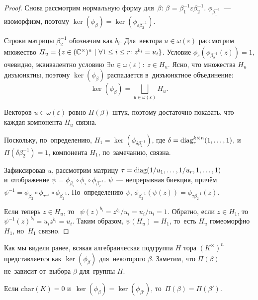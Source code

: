 \documentclass[a4paper,oneside]{article}
\begin{document}
\begin{proof}
    Снова рассмотрим нормальную форму для~$\beta$: $\beta$ = $\beta_1^{-1} \varepsilon \beta_2^{-1}$.
    $\phi_{\beta_1^{-1}}$~— изоморфизм, поэтому $\ker(\phi_{\beta}) = \ker(\phi_{\varepsilon \beta_2^{-1}})$.

    Строки матрицы $\beta_2^{-1}$ обозначим как $b_i$.
    Для~вектора $u \in \omega(\varepsilon)$ рассмотрим множество $H_u = \{z \in (\mathbb{C}^\times)^n \ | \ \forall 1 \leq i \leq r{:}\ z^{b_i} = u_i\}$.
    Условие $\phi_\varepsilon(\phi_{\beta_2^{-1}}(z)) = 1$, очевидно, эквивалентно условию $\exists u \in \omega(\varepsilon){:}\ z \in H_u$.
    Ясно, что множества $H_u$ дизъюнктны, поэтому $\ker(\phi_{\beta})$ распадается в~дизъюнктное объединение:
    $$
        \ker(\phi_{\beta}) = \bigsqcup_{u \in \omega(\varepsilon)} H_u.
    $$

    Векторов $u \in \omega(\varepsilon)$ ровно $\Pi(\beta)$ штук, поэтому достаточно показать, что каждая компонента $H_u$ связна.

    Поскольку, по~определению, $H_1 = \ker(\phi_{\delta \beta_2^{-1}})$, где $\delta = \mathrm{diag}^{k \times n}_r(1, \ldots, 1)$,
    и~$\Pi(\delta \beta_2^{-1}) = 1$, компонента $H_1$, по~замечанию, связна.

    Зафиксировав $u$, рассмотрим матрицу $\tau = \mathrm{diag}(1 / u_1, \ldots, 1 / u_r, 1, \ldots, 1)$ и~отображение $\psi = \phi_{\beta_2} \circ \phi_\tau \circ \phi_{\beta_2^{-1}}$.
    $\psi$~— непрерывная биекция, причём $\psi^{-1} = \phi_{\beta_2} \circ \phi_{\tau^{-1}} \circ \phi_{\beta_2^{-1}}$.
    По~определению $\psi$, $\phi_{\beta_2^{-1}}(\psi(z)) = \phi_{\tau \beta_2^{-1}}(z)$.

    Если теперь $z \in H_u$, то~ $\psi(z)^{b_i} = z^{b_i} / u_i = u_i / u_i = 1$. Обратно, если $z \in H_1$,
    то~$\psi^{-1}(z)^{b_i} = u_i z^{b_i} = u_i$. Таким образом, $\psi(H_u) = H_1$,
    то~есть $H_u$ гомеоморфно $H_1$, но~$H_1$ связно.
\end{proof}

Как мы видели ранее, всякая алгебраическая подгруппа $H$ тора $(K^\times)^n$ представляется как $\ker(\phi_\beta)$
для~некоторого $\beta$. Заметим, что $\Pi(\beta)$ не~зависит от~выбора $\beta$ для~группы $H$.

\begin{theorem}
    Если $\mathrm{char}(K) = 0$ и~$\ker(\phi_{\beta}) = \ker(\phi_{\beta'})$, то~$\Pi(\beta) = \Pi(\beta')$.
\end{theorem}
\end{document}
